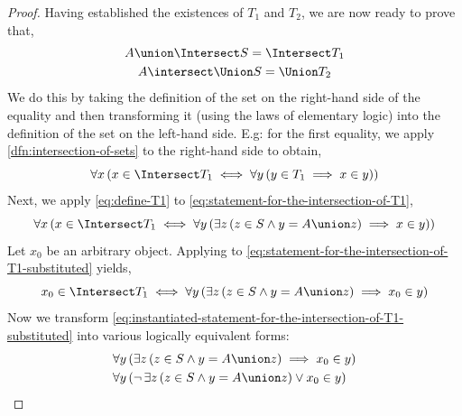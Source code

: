 \begin{proof}
    \vspace{0.5cm}
    \noindent
    Having established the existences of \( T_{1} \) and \( T_{2} \), we are now ready to prove that,
    \begin{gather*}
        A \union \Intersect S =
        \Intersect T_{1} \\
        A \intersect \Union S =
        \Union T_{2}
    \end{gather*}
    We do this by taking the definition of the set on the right-hand side of the equality and then
    transforming it (using the laws of elementary logic) into the definition of the set on the
    left-hand side.
    E.g: for the first equality, we apply \cref{dfn:intersection-of-sets} to the right-hand side to obtain,
    \begin{equation}
        \label{eq:statement-for-the-intersection-of-T1}
        \forall x \, \mleft( x \in \Intersect T_{1}
        \iff
        \forall y \, \mleft( y \in T_{1} \implies x \in y \mright)\mright)
    \end{equation}
    Next, we apply \eqref{eq:define-T1} to \eqref{eq:statement-for-the-intersection-of-T1},
    \begin{equation}
        \label{eq:statement-for-the-intersection-of-T1-substituted}
        \forall x \, \mleft( x \in \Intersect T_{1}
        \iff
        \forall y \, \mleft( \exists z \, \mleft( z \in S \land y = A \union z \mright) \implies x \in y \mright)\mright)
    \end{equation}
    Let \( x_{0} \) be an arbitrary object.
    Applying  to \eqref{eq:statement-for-the-intersection-of-T1-substituted} yields,
    \begin{equation}
        \label{eq:instantiated-statement-for-the-intersection-of-T1-substituted}
        x_{0} \in \Intersect T_{1}
        \iff
        \forall y \, \mleft( \exists z \, \mleft( z \in S \land y = A \union z \mright) \implies x_{0} \in y \mright)
    \end{equation}
    Now we transform \eqref{eq:instantiated-statement-for-the-intersection-of-T1-substituted} into various logically
    equivalent forms:
    \begin{equation*}
        \begin{aligned}
            &\forall y \, \mleft( \exists z \, \mleft( z \in S \land y = A \union z \mright) \implies x_{0} \in y \mright)\\
            &\forall y \, \mleft( \lnot \, \exists z \, \mleft( z \in S \land y = A \union z \mright) \lor x_{0} \in y \mright)\\

\end{aligned}
\end{equation*}
\end{proof}
